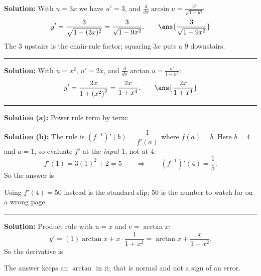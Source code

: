 \documentclass[12pt]{article}
\begin{document}



\textbf{Solution:} With $u = 3x$ we have $u' = 3$, and
$\frac{d}{dx}\arcsin u = \frac{u'}{\sqrt{1-u^2}}$:
\[
  y' = \frac{3}{\sqrt{1 - (3x)^2}} = \frac{3}{\sqrt{1-9x^2}}.
  \qquad \ans{\dfrac{3}{\sqrt{1-9x^2}}}
\]
The $3$ upstairs is the chain-rule factor; squaring $3x$ puts a $9$ downstairs.

\vspace{0.15cm}\noindent\rule{\linewidth}{0.2pt}\vspace{0.15cm}


\textbf{Solution:} With $u = x^2$, $u' = 2x$, and
$\frac{d}{dx}\arctan u = \frac{u'}{1+u^2}$:
\[
  y' = \frac{2x}{1 + \left(x^2\right)^2} = \frac{2x}{1+x^4}.
  \qquad \ans{\dfrac{2x}{1+x^4}}
\]

\vspace{0.15cm}\noindent\rule{\linewidth}{0.2pt}\vspace{0.15cm}


\textbf{Solution (a):} Power rule term by term: 

\textbf{Solution (b):} The rule is
$\left(f^{-1}\right)'(b) = \dfrac{1}{f'(a)}$ where $f(a) = b$. Here $b = 4$ and
$a = 1$, so evaluate $f'$ at the \emph{input} $1$, not at $4$:
\[
  f'(1) = 3(1)^2 + 2 = 5 \qquad\Longrightarrow\qquad
  \left(f^{-1}\right)'(4) = \frac{1}{5}.
\]
So the answer is 

Using $f'(4) = 50$ instead is the standard slip; $50$ is the number to watch for
on a wrong page.

\vspace{0.15cm}\noindent\rule{\linewidth}{0.2pt}\vspace{0.15cm}


\textbf{Solution:} Product rule with $u = x$ and $v = \arctan x$:
\[
  y' = (1)\arctan x + x \cdot \frac{1}{1+x^2}
     = \arctan x + \frac{x}{1+x^2}.
\]
So the derivative is 

The answer keeps an $\arctan$ in it; that is normal and not a sign of an error.
\end{document}
